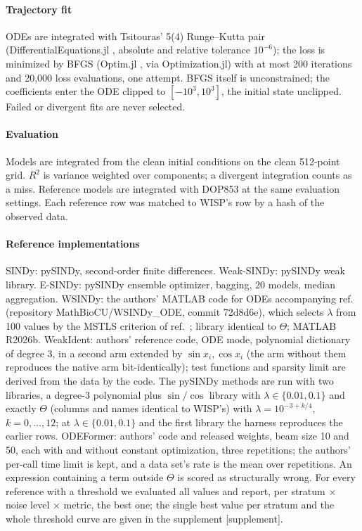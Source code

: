 \documentclass[10pt]{article}
\newcommand{\todo}[1]{\textcolor{prelim}{\sffamily\footnotesize[#1]}}
\begin{document}
\begin{appendices}
\paragraph{Trajectory fit} ODEs are integrated with Tsitouras' 5(4) Runge--Kutta pair \cite{tsitouras2011}
(DifferentialEquations.jl \cite{rackauckas2017}, absolute and relative tolerance $10^{-6}$); the loss is minimized by
BFGS (Optim.jl \cite{mogensen2018}, via Optimization.jl) with at most 200 iterations and 20,000 loss evaluations, one
attempt. BFGS itself is unconstrained; the coefficients enter the ODE clipped to $[-10^3,10^3]$, the initial state
unclipped. Failed or divergent fits are never selected.

\paragraph{Evaluation} Models are integrated from the clean initial conditions on the clean 512-point grid. $R^2$ is
variance weighted over components; a divergent integration counts as a miss. Reference models are integrated with
DOP853 \cite{hairer1993} at the same evaluation settings. Each reference row was matched to WISP's row by a hash of the observed data.

\paragraph{Reference implementations} SINDy: pySINDy, second-order finite differences. Weak-SINDy: pySINDy weak library.
E-SINDy: pySINDy ensemble optimizer, bagging, 20 models, median aggregation. WSINDy: the authors' MATLAB code for
ODEs accompanying ref.~\cite{messenger2021mms} (repository MathBioCU/WSINDy\_ODE, commit 72d8d6e), which selects
$\lambda$ from 100 values by the MSTLS criterion of ref.~\cite{messenger2021jcp}; library identical to $\Theta$;
MATLAB R2026b. WeakIdent: authors' reference code, ODE
mode, polynomial dictionary of degree 3, in a second arm extended by $\sin x_i,\cos x_i$ (the arm without them
reproduces the native arm bit-identically); test functions and sparsity limit are derived from the data by the code.
The pySINDy methods are run with two libraries, a degree-3 polynomial plus $\sin/\cos$ library with
$\lambda\in\{0.01,0.1\}$ and exactly $\Theta$ (columns and names identical to WISP's) with $\lambda=10^{-3+k/4}$,
$k=0,\dots,12$; at $\lambda\in\{0.01,0.1\}$ and the first library the harness reproduces the earlier rows. ODEFormer:
authors' code and released weights, beam size 10 and 50, each with and without constant optimization, three
repetitions; the authors' per-call time limit is kept, and a data set's rate is the mean over repetitions. An
expression containing a term outside $\Theta$ is scored as structurally wrong.
For every reference with a threshold we evaluated all values and report, per stratum $\times$ noise level $\times$
metric, the best one; the single best value per stratum and the whole threshold curve are given in the supplement
\todo{supplement}.


\end{appendices}
\end{document}
